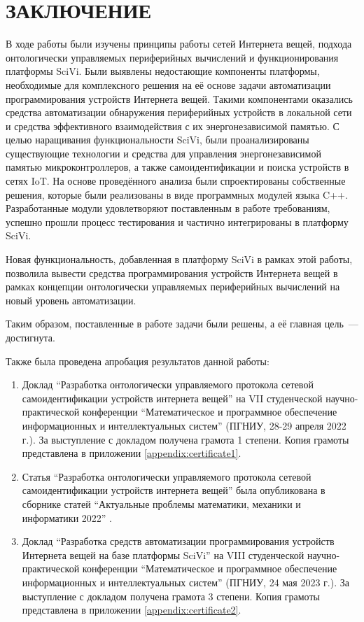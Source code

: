 \chapter*{ЗАКЛЮЧЕНИЕ}

В ходе работы были изучены принципы работы сетей Интернета вещей, подхода онтологически управляемых периферийных вычислений и функционирования платформы SciVi. Были выявлены недостающие компоненты платформы, необходимые для комплексного решения на её основе задачи автоматизации программирования устройств Интернета вещей. Такими компонентами оказались средства автоматизации обнаружения периферийных устройств в локальной сети и средства эффективного взаимодействия с их энергонезависимой памятью.
С целью наращивания функциональности SciVi, были проанализированы существующие технологии и средства для управления энергонезависимой памятью микроконтроллеров, а также самоидентификации и поиска устройств в сетях IoT.
На основе проведённого анализа были спроектированы собственные решения, которые были реализованы в виде программных модулей языка C++.
Разработанные модули удовлетворяют поставленным в работе требованиям, успешно прошли процесс тестирования и частично интегрированы в платформу SciVi.

Новая функциональность, добавленная в платформу SciVi в рамках этой работы, позволила вывести средства программирования устройств Интернета вещей в рамках концепции онтологически управляемых периферийных вычислений на новый уровень автоматизации.

Таким образом, поставленные в работе задачи были решены, а её главная цель~--- достигнута.

Также была проведена апробация результатов данной работы:
\begin{enumerate}
	\item Доклад "`Разработка онтологически управляемого протокола сетевой самоидентификации устройств интернета вещей"' на VII студенческой научно-практической конференции "`Математическое и программное обеспечение информационных и интеллектуальных систем"' (ПГНИУ, 28-29 апреля 2022 г.).
	За выступление с докладом получена грамота 1 степени. Копия грамоты представлена в приложении \ref{appendix:certificate1}.
	\item Статья "`Разработка онтологически управляемого протокола сетевой самоидентификации устройств интернета вещей"' была опубликована в сборнике статей "`Актуальные проблемы математики, механики и информатики 2022"' \cite{incollection:odec-self-id-protocol}.
	\item Доклад "`Разработка средств автоматизации программирования устройств Интернета вещей на базе платформы SciVi"' на VIII студенческой научно-практической конференции "`Математическое и программное обеспечение информационных и интеллектуальных систем"' (ПГНИУ, 24 мая 2023 г.).
	За выступление с докладом получена грамота 3 степени. Копия грамоты представлена в приложении \ref{appendix:certificate2}.
\end{enumerate}
